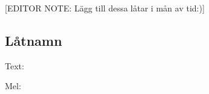 

\pagestyle{Barntillåtet}


[EDITOR NOTE: Lägg till dessa låtar i mån av tid:)]

\subsection{\textbf{Låtnamn}}

Text: 

Mel: \bigskip

\newpage